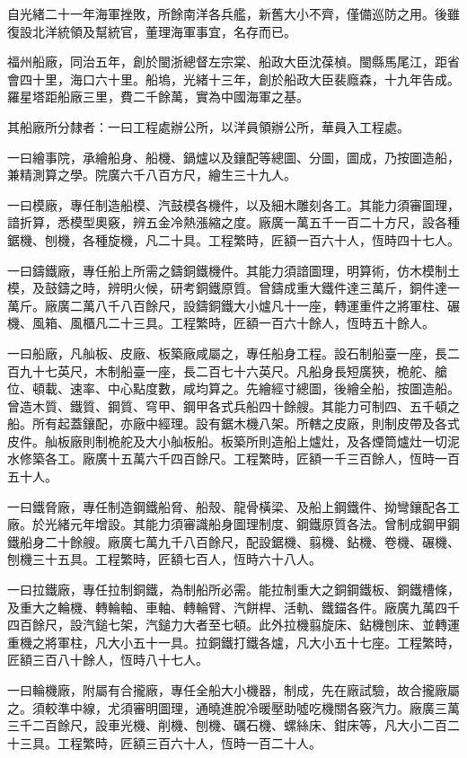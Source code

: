 \begin{pinyinscope}
自光緒二十一年海軍挫敗，所餘南洋各兵艦，新舊大小不齊，僅備巡防之用。後雖復設北洋統領及幫統官，董理海軍事宜，名存而已。

福州船廠，同治五年，創於閩浙總督左宗棠、船政大臣沈葆楨。閩縣馬尾江，距省會四十里，海口六十里。船塢，光緒十三年，創於船政大臣裴廕森，十九年告成。羅星塔距船廠三里，費二千餘萬，實為中國海軍之基。

其船廠所分隸者：一曰工程處辦公所，以洋員領辦公所，華員入工程處。

一曰繪事院，承繪船身、船機、鍋爐以及鑲配等總圖、分圖，圖成，乃按圖造船，兼精測算之學。院廣六千八百方尺，繪生三十九人。

一曰模廠，專任制造船模、汽鼓模各機件，以及細木雕刻各工。其能力須審圖理，諳折算，悉模型奧竅，辨五金冷熱漲縮之度。廠廣一萬五千一百二十方尺，設各種鋸機、刨機，各種旋機，凡二十具。工程繁時，匠額一百六十人，恆時四十七人。

一曰鑄鐵廠，專任船上所需之鑄銅鐵機件。其能力須諳圖理，明算術，仿木模制土模，及鼓鑄之時，辨明火候，研考銅鐵原質。曾鑄成重大鐵件達三萬斤，銅件達一萬斤。廠廣二萬八千八百餘尺，設鑄銅鐵大小爐凡十一座，轉運重件之將軍柱、碾機、風箱、風櫃凡二十三具。工程繁時，匠額一百六十餘人，恆時五十餘人。

一曰船廠，凡舢板、皮廠、板築廠咸屬之，專任船身工程。設石制船臺一座，長二百九十七英尺，木制船臺一座，長二百七十六英尺。凡船身長短廣狹，桅舵、艙位、頓載、速率、中心點度數，咸均算之。先繪經寸總圖，後繪全船，按圖造船。曾造木質、鐵質、鋼質、穹甲、鋼甲各式兵船四十餘艘。其能力可制四、五千頓之船。所有起蓋鑲配，亦廠中經理。設有鋸木機八架。所轄之皮廠，則制皮帶及各式皮件。舢板廠則制桅舵及大小舢板船。板築所則造船上爐灶，及各煙筒爐灶一切泥水修築各工。廠廣十五萬六千四百餘尺。工程繁時，匠額一千三百餘人，恆時一百五十人。

一曰鐵脅廠，專任制造鋼鐵船脅、船殼、龍骨橫梁、及船上鋼鐵件、拗彎鑲配各工廠。於光緒元年增設。其能力須審識船身圖理制度、鋼鐵原質各法。曾制成鋼甲鋼鐵船身二十餘艘。廠廣七萬九千八百餘尺，配設鋸機、翦機、鉆機、卷機、碾機、刨機三十五具。工程繁時，匠額七百人，恆時六十八人。

一曰拉鐵廠，專任拉制銅鐵，為制船所必需。能拉制重大之銅鋼鐵板、銅鐵槽條，及重大之輪機、轉輪軸、車軸、轉輪臂、汽餅桿、活軌、鐵錨各件。廠廣九萬四千四百餘尺，設汽鎚七架，汽鎚力大者至七頓。此外拉機翦旋床、鉆機刨床、並轉運重機之將軍柱，凡大小五十一具。拉銅鐵打鐵各爐，凡大小五十七座。工程繁時，匠額三百八十餘人，恆時八十七人。

一曰輪機廠，附屬有合攏廠，專任全船大小機器，制成，先在廠試驗，故合攏廠屬之。須較準中線，尤須審明圖理，通曉進脫冷暖壓助噓吃機關各竅汽力。廠廣三萬三千二百餘尺，設車光機、削機、刨機、礪石機、螺絲床、鉗床等，凡大小二百二十三具。工程繁時，匠額三百六十人，恆時一百二十人。


\end{pinyinscope}
